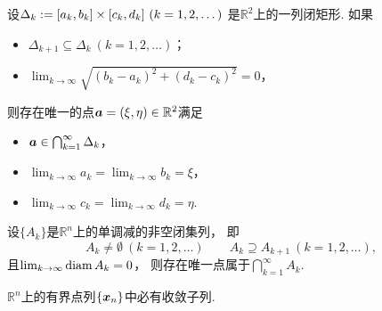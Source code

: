 \begin{theorem}[闭矩形套定理]
设\(\Delta_k := [a_k,b_k]\times[c_k,d_k]\ (k=1,2,\dotsc)\)
是\(\mathbb{R}^2\)上的一列闭矩形.
如果\begin{itemize}
	\item \(\Delta_{k+1} \subseteq \Delta_k\ (k=1,2,\dotsc)\)；
	\item \(\lim_{k\to\infty} \sqrt{(b_k-a_k)^2+(d_k-c_k)^2} = 0\)，
\end{itemize}
则存在唯一的点\(\boldsymbol{a}=(\xi,\eta)\in\mathbb{R}^2\)满足\begin{itemize}
	\item \(\boldsymbol{a}\in\bigcap_{k=1}^\infty \Delta_k\)，
	\item \(\lim_{k\to\infty} a_k = \lim_{k\to\infty} b_k = \xi\)，
	\item \(\lim_{k\to\infty} c_k = \lim_{k\to\infty} d_k = \eta\).
\end{itemize}
\end{theorem}
\begin{theorem}
设\(\{A_k\}\)是\(\mathbb{R}^n\)上的单调减的非空闭集列，
即\[
	A_k\neq\emptyset\ (k=1,2,\dotsc)
	\qquad
	A_k \supseteq A_{k+1}\ (k=1,2,\dotsc),
\]
且\(\lim_{k\to\infty} \operatorname{diam} A_k = 0\)，
则存在唯一点属于\(\bigcap_{k=1}^\infty A_k\).
\end{theorem}

\begin{theorem}
\(\mathbb{R}^n\)上的有界点列\(\{\boldsymbol{x}_n\}\)中必有收敛子列.
\end{theorem}


